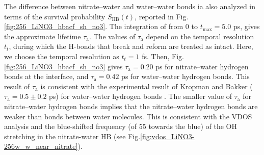 %
The difference between nitrate--water and water--water bonds 
ia also analyzed in terms of the survival probability $S_{\text{HB}}(t)$\cite{AKS86,JT90,AL96}, 
reported in Fig.\thinspace\ref {fig:256_LiNO3_hbacf_sh_no3}.
The integration of \SHB from 0 to $t_{\max}=5.0$ ps\cite{Steinel2004}, gives the approximate lifetime $\tau_\text{a}$\cite{SC02}. 
The values of $\tau_{\text{a}}$ depend on the temporal resolution $t_t$, during which the H-bonds that break and reform are treated as intact\cite{AL00}. 
%
Here, we choose the temporal resolution as $t_t=1$ fs. 
Then, Fig.\thinspace\ref {fig:256_LiNO3_hbacf_sh_no3} gives $\tau_\text{a}=0.20$ ps for nitrate--water hydrogen bonds at the interface, 
and $\tau_\text{a}=0.42$ ps for water--water hydrogen bonds.
This result of $\tau_\text{a}$ is consistent with the experimental result of Kropman and Bakker ($\tau_\text{a}=0.5\pm0.2$ ps) for water--water hydrogen bonds 
\cite{MFK01}. %
The smaller value of $\tau_\text{a}$ for nitrate--water hydrogen bonds implies that the nitrate--water hydrogen bonds are weaker than bonds between water molecules. 
This is consistent with the VDOS analysis and the blue-shifted frequency (of 55 \cm towards the blue) of the OH stretching in the nitrate-water HB 
(see Fig.\thinspace\ref{fig:vdos_LiNO3-256w_w_near_nitrate}). 



